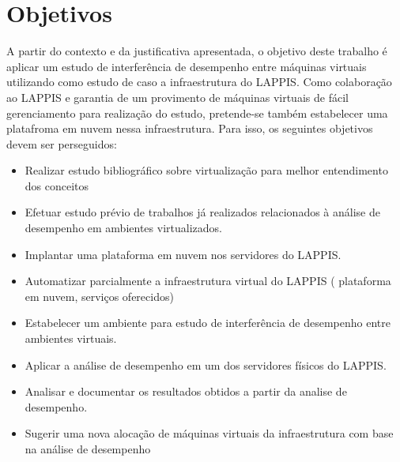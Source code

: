 \section{Objetivos}


A partir do contexto e da justificativa apresentada, o objetivo deste trabalho é aplicar um estudo de interferência de desempenho entre máquinas virtuais utilizando como estudo de caso a infraestrutura do LAPPIS. Como colaboração ao LAPPIS e garantia de um provimento de máquinas virtuais de fácil gerenciamento para realização do estudo, pretende-se também estabelecer uma platafroma em nuvem nessa infraestrutura. Para isso, os seguintes objetivos devem ser perseguidos: 

\begin{itemize}
\item Realizar estudo bibliográfico sobre virtualização para melhor entendimento dos conceitos
\item Efetuar estudo prévio de trabalhos já realizados relacionados à análise de desempenho em ambientes virtualizados.
\item Implantar uma plataforma em nuvem nos servidores do LAPPIS.
\item Automatizar parcialmente a infraestrutura virtual do LAPPIS ( plataforma em nuvem, serviços oferecidos)
\item Estabelecer um ambiente para estudo de interferência de desempenho entre ambientes virtuais.
\item Aplicar a análise de desempenho em um dos servidores físicos do LAPPIS.
\item Analisar e documentar os resultados obtidos a partir da analise de desempenho.
\item Sugerir uma nova alocação de máquinas virtuais da infraestrutura com base na análise de desempenho


\end{itemize}

